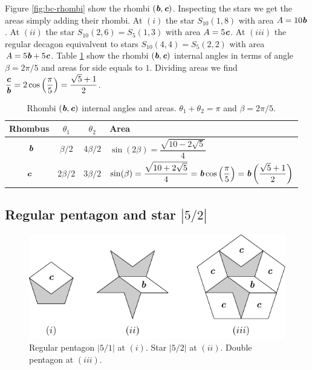 \documentclass[11pt]{article}
\def\mathbi#1{\textbf{\em #1}}
\begin{document}
Figure \ref{fig:bc-rhombi} show the rhombi $(\mathbi{b},\mathbi{c})$. 
Inspecting the stars we get the areas simply adding their rhombi.
At $(i)$ the star $S_{10}(1,8)$ with area $A = 10\mathbi{b}$.
At $(ii)$ the star $S_{10}(2,6) = S_5(1,3)$ with area $A = 5\mathbi{c}$.
At $(iii)$ the regular decagon equivalvent to stars $S_{10}(4,4) = S_5(2,2)$ with area $A = 5\mathbi{b} + 5\mathbi{c}$. 
Table \ref {tbl:bc-angles} show the rhombi $(\mathbi{b},\mathbi{c})$ internal angles in terms of angle $\beta = 2\pi/5$ and areas for side equals to $1$. Dividing areas we find $\dfrac{\mathbi{c}}{\mathbi{b}} = 2\cos\left(\dfrac{\pi}5\right) = \dfrac{\sqrt5 + 1}2$.

\begin{table}[H]
\begin{center}
\begin{tabular}{|c|c c| l |}
\hline
Rhombus & $\theta_1$ & $\theta_2$ & Area \\ \hline\
$\mathbi{b}$ & $\beta/2$ & $4\beta/2$ & $\sin(2\beta) = \dfrac{\sqrt{10-2\sqrt5}}4 $
\\[1.2ex] \hline
$\mathbi{c}$ & $2\beta/2$ & $3\beta/2$ & 
$\sin(\beta) = \dfrac{\sqrt{10+2\sqrt5}}4 
= \mathbi{b}\cos\left(\dfrac{\pi}5\right) = \mathbi{b}\left(\dfrac{\sqrt5+1}2\right)$
\\[1.2ex] \hline
\end{tabular}
\caption{Rhombi $(\mathbi{b},\mathbi{c})$ internal angles and areas. $\theta_1 + \theta_2 = \pi$ and $\beta = 2\pi/5$.} 
\label{tbl:bc-angles}
\end{center}
\end{table}



\subsection{Regular pentagon and star $|5/2|$}

\begin{figure}[H]
\centering
\includegraphics[scale=1.1]{bc/penta}
\caption{Regular pentagon $|5/1|$ at $(i)$. Star $|5/2|$ at $(ii)$. Double pentagon at $(iii)$.}
\label{fig:bc-penta}
\end{figure}
\end{document}
